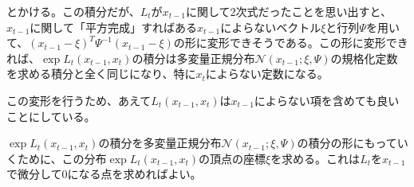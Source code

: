 \documentclass{jarticle}
\begin{document}
とかける。この積分だが、$L_t$が$x_{t-1}$に関して2次式だったことを思い出すと、$x_{t-1}$に関して「平方完成」すればある$x_{t-1}$によらないベクトル$\xi$と行列$\Psi$を用いて、$(x_{t-1}-\xi)^T \Psi^{-1} (x_{t-1}-\xi)$の形に変形できそうである。この形に変形できれば、$\exp L_t (x_{t-1},x_t)$の積分は多変量正規分布$\mathcal{N}(x_{t-1};\xi,\Psi )$の規格化定数を求める積分と全く同じになり、特に$x_t$によらない定数になる。

この変形を行うため、あえて$L_t (x_{t-1},x_t)$は$x_{t-1}$によらない項を含めても良いことにしている。

$\exp L_t (x_{t-1},x_t)$の積分を多変量正規分布$\mathcal{N}(x_{t-1};\xi,\Psi )$の積分の形にもっていくために、この分布$\exp L_t (x_{t-1},x_t)$の頂点の座標$\xi$を求める。これは$L_t$を$x_{t-1}$で微分して0になる点を求めればよい。
\end{document}
